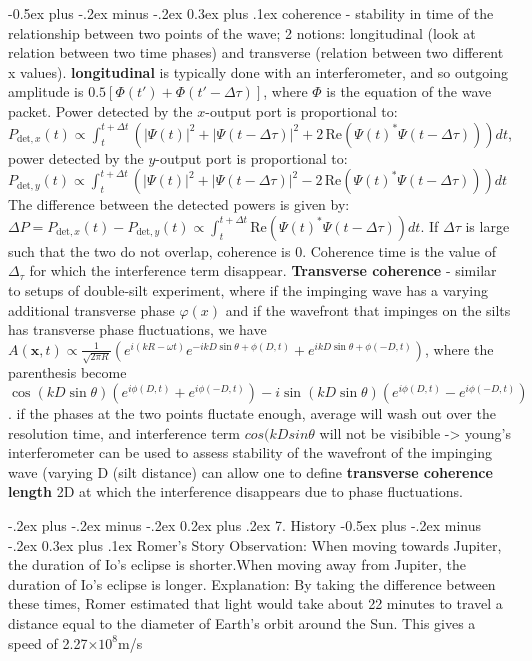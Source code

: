 \documentclass[a4paper,11pt,portrait]{article}
\makeatletter
\renewcommand{\section}{\@startsection{section}{1}{0mm}%
                            {-.2ex plus -.2ex minus -.2ex}%
                            {0.2ex plus .2ex}%
                            {\normalfont\tiny\bfseries}}
\renewcommand{\subsection}{\@startsection{subsection}{2}{0mm}%
                                {-0.5ex plus -.2ex minus -.2ex}%
                                {0.3ex plus .1ex}%
                                {\normalfont\footnotesize\bfseries}}
\makeatother
\begin{document}
\begin{multicols}{3}
\subsection{coherence} - stability in time of the relationship between two points of the wave; 2 notions: longitudinal (look at relation between two time phases) and transverse (relation between two different x values). \textbf{longitudinal} is typically done with an interferometer, and so outgoing amplitude is $0.5 [\Phi(t')+\Phi(t' - \Delta \tau)]$, where $\Phi$ is the equation of the wave packet. Power detected by the \( x \)-output port is proportional to: $
P_{\text{det},x}(t) \propto \int_t^{t+\Delta t} \left( |\Psi(t)|^2 + |\Psi(t - \Delta \tau)|^2 + 2 \, \text{Re}(\Psi(t)^* \Psi(t - \Delta \tau)) \right) dt$, power detected by the \( y \)-output port is proportional to:
$P_{\text{det},y}(t) \propto \int_t^{t + \Delta t} \left( |\Psi(t)|^2 + |\Psi(t - \Delta \tau)|^2 - 2 \, \text{Re}(\Psi(t)^* \Psi(t - \Delta \tau)) \right) dt$
The difference between the detected powers is given by:
$\Delta P = P_{\text{det},x}(t) - P_{\text{det},y}(t) \propto \int_t^{t + \Delta t} \text{Re}(\Psi(t)^* \Psi(t - \Delta \tau)) dt$. If $\Delta \tau$ is large such that the two do not overlap, coherence is 0. Coherence time is the value of $\Delta_\tau$ for which the interference term disappear.
\textbf{Transverse coherence} - similar to setups of double-silt experiment, where if the impinging wave has a varying additional transverse phase $\varphi(x)$ and if the wavefront that impinges on the silts has transverse phase fluctuations, we have $A(\mathbf{x}, t) \propto \frac{1}{\sqrt{2 \pi R}} \left( e^{i(kR - \omega t)} e^{-ikD \sin \theta + \phi(D, t)} + e^{ikD \sin \theta + \phi(-D, t)} \right)$, where the parenthesis become $\cos(kD \sin \theta) \left( e^{i \phi(D, t)} + e^{i \phi(-D, t)} \right) - i \sin(kD \sin \theta) \left( e^{i \phi(D, t)} - e^{i \phi(-D, t)} \right)$. if the phases at the two points fluctate enough, average will wash out over the resolution time, and interference term $cos(kD sin\theta$ will not be visibible -> young's interferometer can be used to assess stability of the wavefront of the impinging wave (varying D (silt distance) can allow one to define \textbf{transverse coherence length} 2D at which the interference disappears due to phase fluctuations.

\section{7. History}
\subsection{Romer's Story}
Observation:
When moving towards Jupiter, the duration of Io's eclipse is shorter.When moving away from Jupiter, the duration of Io's eclipse is longer.
Explanation:
By taking the difference between these times, Romer estimated that light would take about 22 minutes to travel a distance equal to the diameter of Earth's orbit around the Sun. This gives a speed of 2.27$\times10^8$m/s


\end{multicols}
\end{document}
